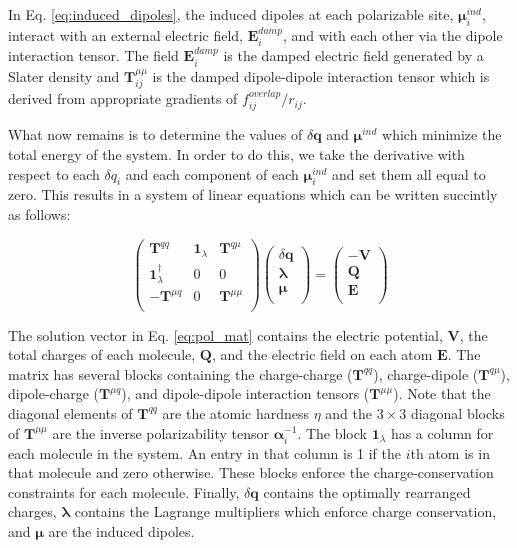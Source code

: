\documentclass[journal=jacsat,manuscript=article]{achemso}
\begin{document}
In Eq. \ref{eq:induced_dipoles}, the induced dipoles at each polarizable site, $\bm{\mu}_i^{ind}$,
interact with an external electric field, $\bm{E}_i^{damp}$, and with each other via the dipole interaction tensor.
The field $\bm{E}_i^{damp}$ is the damped electric field generated by a Slater density
and $\bm{T}^{\mu\mu}_{ij}$ is the damped dipole-dipole interaction tensor which is derived from appropriate
gradients of $f_{ij}^{overlap}/r_{ij}$.

What now remains is to determine the values of $\delta \bm{q}$ and $\bm{\mu}^{ind}$
which minimize the total energy of the system. In order to do this, we take
the derivative with respect to each $\delta q_i$ and each component of each
$\bm{\mu}_i^{ind}$ and set them all equal to zero. This results in a system of linear
equations which can be written succintly as follows:


\begin{equation}
  \begin{pmatrix}
    \bm{T}^{qq} & \bm{1}_\lambda & \bm{T}^{q\mu} \\
    \bm{1}_\lambda^\dagger & 0 & 0 \\
    -\bm{T}^{\mu q} & 0 & \bm{T}^{\mu\mu} \\
  \end{pmatrix}
  \begin{pmatrix}
    \delta \bm{q} \\
    \bm{\lambda} \\
    \bm{\mu} \\
  \end{pmatrix}
  =
  \begin{pmatrix}
    -\bm{V} \\
    \bm{Q} \\
    \bm{E} \\
  \end{pmatrix}
  \label{eq:pol_mat}
\end{equation}

The solution vector in Eq. \ref{eq:pol_mat} contains the electric potential,
$\bm{V}$, the total charges of each molecule, $\bm{Q}$, and the electric
field on each atom $\bm{E}$. The matrix has several blocks containing the
charge-charge ($\bm{T}^{qq}$), charge-dipole ($\bm{T}^{q\mu}$),
dipole-charge ($\bm{T}^{\mu q}$), and dipole-dipole interaction tensors ($\bm{T}^{\mu\mu}$).
Note that the diagonal elements of $\bm{T}^{qq}$ are the atomic hardness $\eta$ and
the $3\times 3$ diagonal blocks of $\bm{T}^{\mu\mu}$ are the inverse polarizability tensor
$\bm{\alpha}_i^{-1}$. The block $\bm{1}_\lambda$ has a column for each molecule in the system.
An entry in that column is 1 if the $i$th atom is in that molecule and zero otherwise.
These blocks enforce the charge-conservation constraints for each molecule.
Finally, $\delta\bm{q}$ contains the optimally rearranged charges, $\bm{\lambda}$ contains
the Lagrange multipliers which enforce charge conservation, and $\bm{\mu}$ are the induced dipoles.
\end{document}
